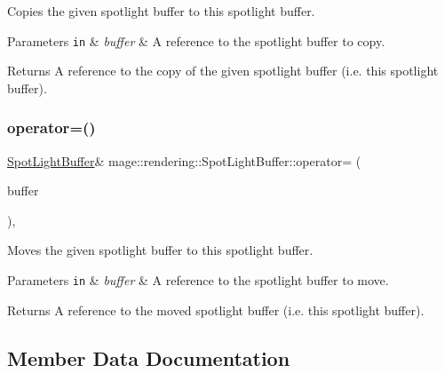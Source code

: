 Copies the given spotlight buffer to this spotlight buffer.


\begin{DoxyParams}[1]{Parameters}
\mbox{\tt in}  & {\em buffer} & A reference to the spotlight buffer to copy. \\
\hline
\end{DoxyParams}
\begin{DoxyReturn}{Returns}
A reference to the copy of the given spotlight buffer (i.\+e. this spotlight buffer). 
\end{DoxyReturn}
\mbox{\label{structmage_1_1rendering_1_1_spot_light_buffer_ab3d50a0d08d284577b0e43b05c34e287}} 
\subsubsection{\texorpdfstring{operator=()}{operator=()}\hspace{0.1cm}{\footnotesize\ttfamily [2/2]}}
{\footnotesize\ttfamily \mbox{\hyperlink{structmage_1_1rendering_1_1_spot_light_buffer}{Spot\+Light\+Buffer}}\& mage\+::rendering\+::\+Spot\+Light\+Buffer\+::operator= (\begin{DoxyParamCaption}\item[{\mbox{\hyperlink{structmage_1_1rendering_1_1_spot_light_buffer}{Spot\+Light\+Buffer}} \&\&}]{buffer }\end{DoxyParamCaption})\hspace{0.3cm}{\ttfamily [default]}, {\ttfamily [noexcept]}}

Moves the given spotlight buffer to this spotlight buffer.


\begin{DoxyParams}[1]{Parameters}
\mbox{\tt in}  & {\em buffer} & A reference to the spotlight buffer to move. \\
\hline
\end{DoxyParams}
\begin{DoxyReturn}{Returns}
A reference to the moved spotlight buffer (i.\+e. this spotlight buffer). 
\end{DoxyReturn}


\subsection{Member Data Documentation}
\mbox{\label{structmage_1_1rendering_1_1_spot_light_buffer_a80c169b3f3e87c7d91a7b2b4473e4136}} 
